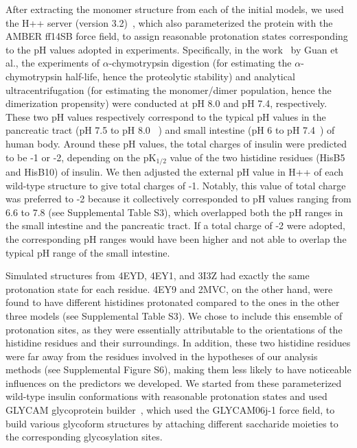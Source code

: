 \documentclass[sn-vancouver]{sn-jnl}
\begin{document}
After extracting the monomer structure from each of the initial models, we used the H++ server (version 3.2)~\cite{anandakrishnan2012h++, myers2006simple, gordon2005h++}, which also parameterized the protein with the AMBER ff14SB force field, to assign reasonable protonation states corresponding to the pH values adopted in experiments. Specifically, in the work~\cite{guan2018chemically} by Guan et al., the experiments of $\alpha$-chymotrypsin digestion (for estimating the $\alpha$-chymotrypsin half-life, hence the proteolytic stability) and analytical ultracentrifugation (for estimating the monomer/dimer population, hence the dimerization propensity) were conducted at pH 8.0 and pH 7.4, respectively. These two pH values respectively correspond to the typical pH values in the pancreatic tract (pH 7.5 to pH 8.0 ~\cite{mcqueen2017comprehensive}) and small intestine (pH 6 to pH 7.4~\cite{fallingborg1999intraluminal}) of human body. Around these pH values, the total charges of insulin were predicted to be -1 or -2,  depending on the pK$_{1/2}$ value of the two histidine residues (HisB5 and HisB10) of insulin. We then adjusted the external pH value in H++ of each wild-type structure to give total charges of -1. Notably, this value of total charge was preferred to -2 because it collectively corresponded to pH values ranging from 6.6 to 7.8 (see Supplemental Table S3), which overlapped both the pH ranges in the small intestine and the pancreatic tract. If a total charge of -2 were adopted, the corresponding pH ranges would have been higher and not able to overlap the typical pH range of the small intestine.

Simulated structures from 4EYD, 4EY1, and 3I3Z had exactly the same protonation state for each residue. 4EY9 and 2MVC, on the other hand, were found to have different histidines protonated compared to the ones in the other three models (see Supplemental Table S3).  We chose to include this ensemble of protonation sites, as they were essentially attributable to the orientations of the histidine residues and their surroundings. In addition, these two histidine residues were far away from the residues involved in the hypotheses of our analysis methods (see Supplemental Figure S6), making them less likely to have noticeable influences on the predictors we developed. We started from these parameterized wild-type insulin conformations with reasonable protonation states and used GLYCAM glycoprotein builder~\cite{kirschner2008glycam06}, which used the GLYCAM06j-1 force field, to build various glycoform structures by attaching different saccharide moieties to the corresponding glycosylation sites. 
\end{document}
